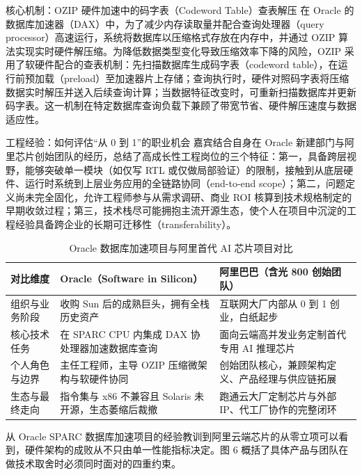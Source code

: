 \documentclass[UTF8,a4paper,11pt,fontset=fandol]{ctexart}
\begin{document}
\begin{importantbox}{核心机制：OZIP 硬件加速中的码字表（Codeword Table）查表解压}
在 Oracle 的数据库加速器（DAX）中，为了减少内存读取量并配合查询处理器（query processor）高速运行，系统将数据库以压缩格式存放在内存中，并通过 OZIP 算法实现实时硬件解压缩。为降低数据类型变化导致压缩效率下降的风险，OZIP 采用了软硬件配合的查表机制：先扫描数据库生成码字表（codeword table），在运行前预加载（preload）至加速器片上存储；查询执行时，硬件对照码字表将压缩数据实时解压并送入后续查询计算；当数据特征改变时，可重新扫描数据库并更新码字表。这一机制在特定数据库查询负载下兼顾了带宽节省、硬件解压速度与数据适应性。
\end{importantbox}
\begin{knowledgebox}{工程经验：如何评估“从 0 到 1”的职业机会}
嘉宾结合自身在 Oracle 新建部门与阿里芯片创始团队的经历，总结了高成长性工程岗位的三个特征：第一，具备跨层视野，能够突破单一模块（如仅写 RTL 或仅做局部验证）的限制，接触到从底层硬件、运行时系统到上层业务应用的全链路协同（end-to-end scope）；第二，问题定义尚未完全固化，允许工程师参与从需求调研、商业 ROI 核算到技术规格制定的早期收敛过程；第三，技术栈尽可能拥抱主流开源生态，使个人在项目中沉淀的工程经验具备跨企业的长期可迁移性（transferability）。
\end{knowledgebox}
\begin{table}[H]\centering\small
\caption{Oracle 数据库加速项目与阿里首代 AI 芯片项目对比}
\begin{tabular}{>{\raggedright\arraybackslash}p{\dimexpr(\linewidth-6\tabcolsep)/3\relax}>{\raggedright\arraybackslash}p{\dimexpr(\linewidth-6\tabcolsep)/3\relax}>{\raggedright\arraybackslash}p{\dimexpr(\linewidth-6\tabcolsep)/3\relax}}
\toprule
对比维度 & Oracle（Software in Silicon） & 阿里巴巴（含光 800 创始团队）\\\midrule
组织与业务阶段 & 收购 Sun 后的成熟巨头，拥有全栈历史资产 & 互联网大厂内部从 0 到 1 创业，白纸起步\\[4pt]
核心技术任务 & 在 SPARC CPU 内集成 DAX 协处理器加速数据库查询 & 面向云端高并发业务定制首代专用 AI 推理芯片\\[4pt]
个人角色与边界 & 主任工程师，主导 OZIP 压缩微架构与软硬件协同 & 创始团队核心，兼顾架构定义、产品经理与供应链拓展\\[4pt]
生态与最终走向 & 指令集与 x86 不兼容且 Solaris 未开源，生态萎缩后裁撤 & 跑通云大厂定制芯片与外部 IP、代工厂协作的完整闭环\\[4pt]
\bottomrule\end{tabular}\end{table}
从 Oracle SPARC 数据库加速项目的经验教训到阿里云端芯片的从零立项可以看到，硬件架构的成败从不只由单一性能指标决定。图 6 概括了具体产品与团队在做技术取舍时必须同时面对的四重约束。
\end{document}
